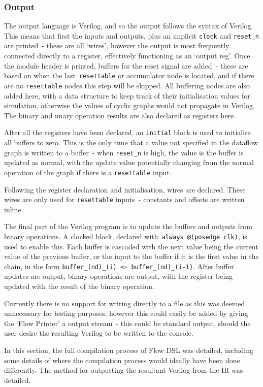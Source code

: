 \subsubsection{Output}
The output language is Verilog, and so the output follows the syntax of Verilog. This means that first the inputs and outputs, plus an implicit \lstinline|clock| and \lstinline|reset_n| are printed \hyphen{} these are all `wires', however the output is most frequently connected directly to a register, effectively functioning as an `output reg'. Once the module header is printed, buffers for the reset signal are added \hyphen{} these are based on when the last \lstinline|resettable| or accumulator node is located, and if there are no \lstinline|resettable| nodes this step will be skipped. All buffering nodes are also added here, with a data structure to keep track of their initialisation values for simulation, otherwise the values of cyclic graphs would not propagate in Verilog. The binary and unary operation results are also declared as registers here.

After all the registers have been declared, an \lstinline|initial| block is used to initialise all buffers to zero. This is the only time that a value not specified in the dataflow graph is written to a buffer \hyphen{} when \lstinline|reset_n| is high, the value is the buffer is updated as normal, with the update value potentially changing from the normal operation of the graph if there is a \lstinline|resettable| input.

Following the register declaration and initialisation, wires are declared. These wires are only used for \lstinline|resettable| inputs \hyphen{} constants and offsets are written inline.

The final part of the Verilog program is to update the buffers and outputs from binary operations. A clocked block, declared with \lstinline|always @(posedge clk)|, is used to enable this. Each buffer is cascaded with the next value being the current value of the previous buffer, or the input to the buffer if it is the first value in the chain, in the form \lstinline|buffer_(nd)_(i) <= buffer_(nd)_(i-1)|. After buffer updates are output, binary operations are output, with the register being updated with the result of the binary operation.

Currently there is no support for writing directly to a file as this was deemed unnecessary for testing purposes, however this could easily be added by giving the `Flow Printer' a output stream \hyphen{} this could be standard output, should the user desire the resulting Verilog to be written to the console.

\par\noindent\hrulefill\par

In this section, the full compilation process of Flow DSL was detailed, including some details of where the compilation process would ideally have been done differently. The method for outputting the resultant Verilog from the IR was detailed.
